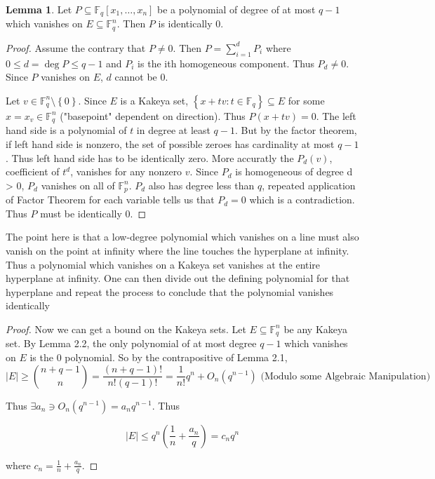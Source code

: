 \documentclass{article}
\newcommand*{\subeq}{\subseteq}
\newcommand{\F}{\mathbb{F}}
\newcommand{\abs}[1]{\left\lvert #1\right\rvert}
\theoremstyle{definition}
\newtheorem{lemma}{Lemma}[section]
\begin{document}
\begin{lemma}
    Let $P \subeq \F_q[x_1, \dots, x_n]$ be a polynomial of degree of at most $q - 1$ which vanishes on $E \subeq \F_q^n$. Then $P$ is identically 0.    
\end{lemma}
\begin{proof}
    Assume the contrary that $P \neq 0$. Then $P = \sum_{i = 1}^d P_i$ where $0 \leq d = \deg P \leq q - 1$ and $P_i$ is the ith homogeneous component. Thus $P_d \neq 0$. Since $P$ vanishes on $E$, $d$ cannot be $0$.
    
    Let $v \in \F_q^n \setminus \left\{ 0 \right\}$. Since $E$ is a Kakeya set, $\left\{ x + tv : t \in \F_q \right\} \subeq E$ for some $x = x_v \in \F_q^n$ ("basepoint" dependent on direction). Thus $P(x + tv) = 0$. The left hand side is a polynomial of $t$ in degree at least $q - 1$. But by the factor theorem, if left hand side is nonzero, the set of possible zeroes has cardinality at most $q - 1$. Thus left hand side has to be identically zero. More accuratly the $P_d(v)$, coefficient of $t^d$, vanishes for any nonzero $v$.  Since $P_d$ is homogeneous of degree d > 0, $P_d$ vanishes on all of $\F_p^n$. $P_d$ also has degree less than $q$, repeated application of Factor Theorem for each variable tells us that $P_d = 0$ which is a contradiction. Thus $P$ must be identically 0.                 
\end{proof}

The point here is that a low-degree polynomial which vanishes on a line must also vanish on the point at infinity where the line touches the hyperplane at infinity. Thus a polynomial which vanishes on a Kakeya set vanishes at the entire hyperplane at infinity. One can then divide out the defining polynomial for that hyperplane and repeat the process to conclude that the polynomial vanishes identically

\begin{proof}
    Now we can get a bound on the Kakeya sets. Let $E \subeq \F_q^n$ be any Kakeya set. By Lemma 2.2, the only polynomial of at most degree $q - 1$ which vanishes on $E$ is the 0 polynomial. So by the contrapositive of Lemma 2.1, \[\abs{E} \geq {n + q - 1 \choose n} = \frac{(n + q - 1)!}{n! (q - 1)!} = \frac{1}{n!}q^n + O_n(q^{n - 1}) \text{ (Modulo some Algebraic Manipulation)}\]    

Thus $\exists a_n \ni O_n(q^{n - 1}) = a_n q^{n - 1}$. Thus 

\[\abs{E} \leq q^n \left(\frac{1}{n} + \frac{a_n}{q}\right) = c_n q^n\]

where $c_n = \frac{1}{n} + \frac{a_n}{q}$.  
\end{proof}
\end{document}
